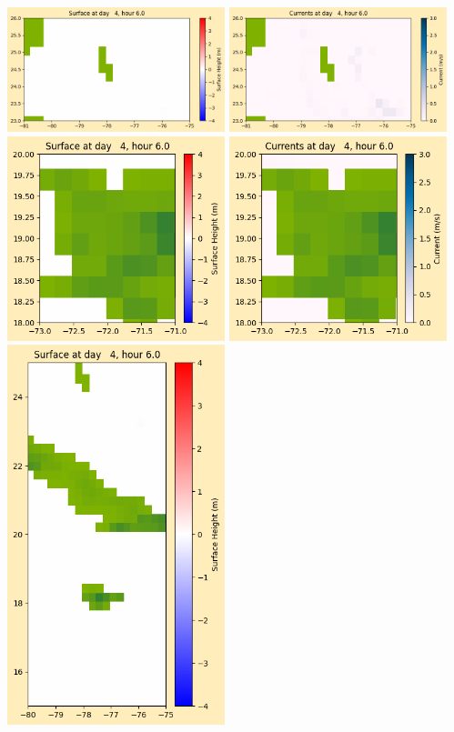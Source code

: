 \documentclass[11pt]{article}
\begin{document}
\vskip 10pt 
\includegraphics[width=0.475\textwidth]{frame0029fig1003.png}
\includegraphics[width=0.475\textwidth]{frame0029fig1004.png}
\vskip 10pt 
\includegraphics[width=0.475\textwidth]{frame0029fig1005.png}
\includegraphics[width=0.475\textwidth]{frame0029fig1006.png}
\vskip 10pt 
\includegraphics[width=0.475\textwidth]{frame0029fig1007.png}
\end{document}
